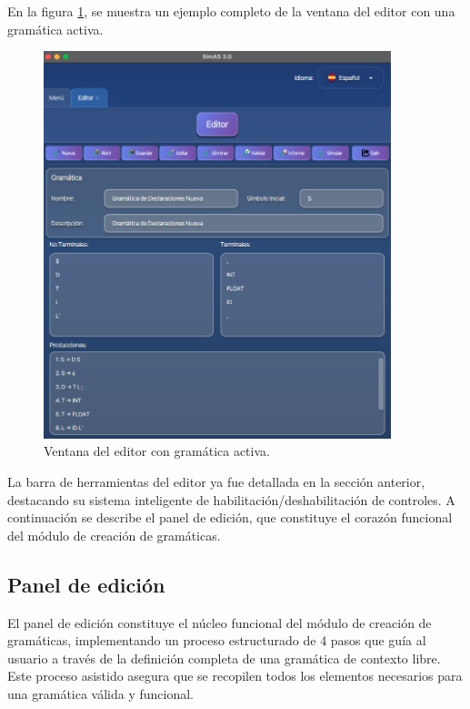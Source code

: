 En la figura \ref{fig:d3}, se muestra un ejemplo completo de la ventana del editor con una gramática activa.

\needspace{8cm}
\begin{figure}[H]
\centering
\includegraphics[width=0.9\textwidth]{figuras2/ejemplo_practico/editor.png}
\caption{Ventana del editor con gramática activa.}
\label{fig:d3}
\end{figure}

La barra de herramientas del editor ya fue detallada en la sección anterior, destacando su sistema inteligente de habilitación/deshabilitación de controles. A continuación se describe el panel de edición, que constituye el corazón funcional del módulo de creación de gramáticas.

\subsection{Panel de edición}

El panel de edición constituye el núcleo funcional del módulo de creación de gramáticas, implementando un proceso estructurado de 4 pasos que guía al usuario a través de la definición completa de una gramática de contexto libre. Este proceso asistido asegura que se recopilen todos los elementos necesarios para una gramática válida y funcional.

